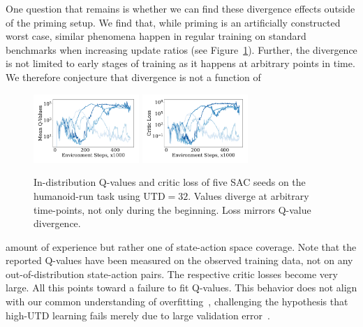 One question that remains is whether we can find these divergence effects outside of the priming setup. We find that, while priming is an artificially constructed worst case, similar phenomena happen in regular training on standard benchmarks when increasing update ratios (see Figure~\ref{fig:humanoid_failure}). Further, the divergence is not limited to early stages of training as it happens at arbitrary points in time.
We therefore conjecture that divergence is not a function of 
\begin{figure}
\vspace{-5pt}
  \begin{minipage}{\linewidth}
    \centering\captionsetup[subfigure]{justification=centering}
    \includegraphics[width=4cm, trim=1cm 1cm 1cm 1cm ,clip]{figures/dissecting/priming/humanoid_Q.pdf}\vspace{-8pt}
    \includegraphics[width=4cm, trim=1cm 1cm 1cm 1cm ,clip]{figures/dissecting/priming/humanoid_loss.pdf}
    \caption{In-distribution Q-values and critic loss of five SAC seeds on the humanoid-run task using $\mathrm{UTD}=32$. Values diverge at arbitrary time-points, not only during the beginning. Loss mirrors Q-value divergence.}
    \label{fig:humanoid_failure}
  \end{minipage}
  \vspace{-15pt}
\end{figure}
amount of experience but rather one of state-action space coverage. Note that the reported Q-values have been measured on the observed training data, not on any out-of-distribution state-action pairs. 
The respective critic losses become very large. All this points toward a failure to fit Q-values. This behavior does not align with our common understanding of overfitting~\parencite{bishop2006pattern},  challenging the hypothesis that high-UTD learning fails merely due to large validation error~\parencite{li2023efficient}.

